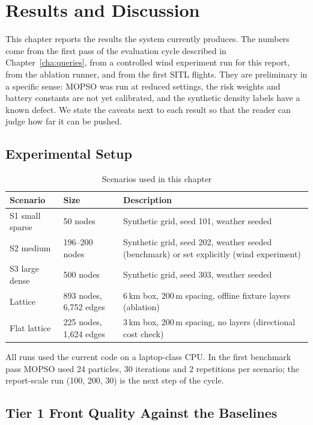 \documentclass{ssnreview}
\newcommand{\flowchapter}[1]{\par\addvspace{30pt}\let\origclearpage\clearpage\let\clearpage\relax\chapter{#1}\let\clearpage\origclearpage}  %
\begin{document}
\flowchapter{Results and Discussion}\label{cha:results}

This chapter reports the results the system currently produces. The numbers come from the
first pass of the evaluation cycle described in Chapter~\ref{cha:queries}, from a
controlled wind experiment run for this report, from the ablation runner, and from the
first SITL flights. They are preliminary in a specific sense: MOPSO was run at reduced
settings, the risk weights and battery constants are not yet calibrated, and the
synthetic density labels have a known defect. We state the caveats next to each result
so that the reader can judge how far it can be pushed.

\section{Experimental Setup}

\begin{table}[H]
\centering\caption{Scenarios used in this chapter}\label{tab:scenarios}\small
\begin{tabularx}{\textwidth}{L{3.2cm} L{2.2cm} Y}
\toprule
\textbf{Scenario} & \textbf{Size} & \textbf{Description}\\
\midrule
S1 small sparse & 50 nodes & Synthetic grid, seed 101, weather seeded\\
S2 medium & 196--200 nodes & Synthetic grid, seed 202, weather seeded (benchmark) or set explicitly (wind experiment)\\
S3 large dense & 500 nodes & Synthetic grid, seed 303, weather seeded\\
Lattice & 893 nodes, 6,752 edges & 6\,km box, 200\,m spacing, offline fixture layers (ablation)\\
Flat lattice & 225 nodes, 1,624 edges & 3\,km box, 200\,m spacing, no layers (directional cost check)\\
\bottomrule
\end{tabularx}
\end{table}

All runs used the current code on a laptop-class CPU. In the first
benchmark pass MOPSO used 24 particles, 30 iterations and 2 repetitions per scenario; the
report-scale run (100, 200, 30) is the next step of the cycle.

\section{Tier 1 Front Quality Against the Baselines}
\end{document}
